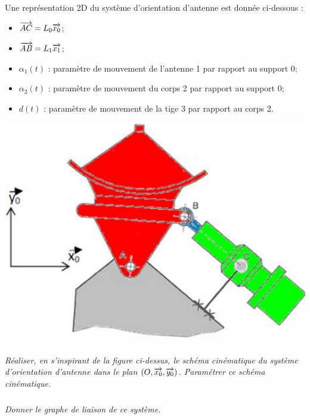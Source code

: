 \documentclass[10pt,fleqn]{article} %
\begin{document}
\begin{multicols}{2}
Une représentation 2D du système d’orientation d’antenne est donnée ci-dessous :
\begin{itemize}
\item $\overrightarrow{AC}=L_0\overrightarrow{x_0}$;
\item $\overrightarrow{AB}=L_1\overrightarrow{x_1}$;
\item $\alpha_1(t)$ : paramètre de mouvement de l’antenne 1 par rapport au support 0; 
\item $\alpha_2(t)$ : paramètre de mouvement du corps 2 par rapport au support 0;
\item $d(t)$ : paramètre de mouvement de la tige 3 par rapport au corps 2. 
\end{itemize}
\begin{center}
\includegraphics[width=.95\linewidth]{images/fig6} 
\end{center}


\subparagraph{}
\textit{Réaliser, en s’inspirant de la figure ci-dessus, le schéma cinématique du système d’orientation d’antenne dans le plan 
$\left(O,\overrightarrow{x_0},\overrightarrow{y_0}\right)$. Paramétrer ce schéma cinématique. }

\ifprof
\begin{corrige}
\end{corrige}
\else \fi

\subparagraph{}
\textit{Donner le graphe de liaison de ce système.}

\ifprof
\begin{corrige}
\end{corrige}
\else \fi


\end{multicols}
\end{document}
